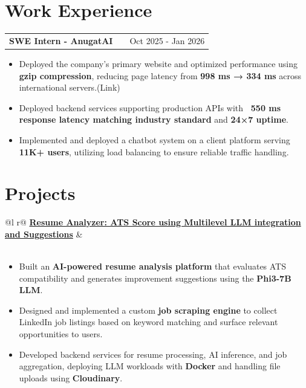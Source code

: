 \documentclass[a4paper,12pt]{article}
\makeatletter
\newenvironment{jobshort}[2]
{
\begin{tabularx}{\linewidth}{@{}l X r@{}}
\textbf{#1} & \hfill & #2 \\[3pt]
\end{tabularx}
}
{}
\makeatother
\begin{document}

\section{Work Experience}

\begin{jobshort}{SWE Intern - AnugatAI}{Oct 2025 - Jan 2026}
\begin{itemize}
\item Deployed the company’s primary website and optimized performance using \textbf{gzip compression}, reducing page latency from \textbf{998 ms → 334 ms} across international servers.(Link)
\item Deployed backend services supporting production APIs with \textbf{~550 ms response latency matching industry standard} and \textbf{24×7 uptime}.
\item Implemented and deployed a chatbot system on a client platform serving \textbf{11K+ users}, utilizing load balancing to ensure reliable traffic handling.
\end{itemize}
\end{jobshort}


\section{Projects}

\begin{tabularx}{\linewidth}{@{}l r@{}}
\textbf{\href{https://github.com/rudrakshSoni-dev/resume-analyzer-server}{Resume Analyzer: ATS Score using Multilevel LLM integration and Suggestions}} & \\
 \\
\end{tabularx}

\begin{itemize}
\item Built an \textbf{AI-powered resume analysis platform} that evaluates ATS compatibility and generates improvement suggestions using the \textbf{Phi3-7B LLM}.
\item Designed and implemented a custom \textbf{job scraping engine} to collect LinkedIn job listings based on keyword matching and surface relevant opportunities to users.
\item Developed backend services for resume processing, AI inference, and job aggregation, deploying LLM workloads with \textbf{Docker} and handling file uploads using \textbf{Cloudinary}.
\end{itemize}
\end{document}
